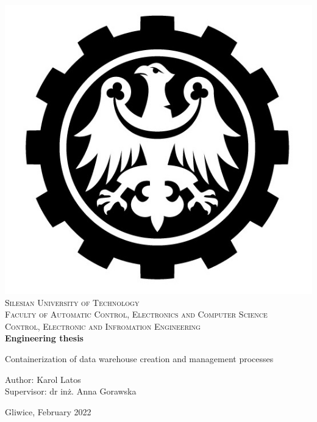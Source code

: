 \newpage \vspace{-5cm}
\thispagestyle{empty}


\begin{onehalfspacing}
\begin{center}

\centering
\includegraphics[keepaspectratio, scale=0.5]{./figures/polsl_eng_notext.jpg} \\[.8cm]

{\fontsize{17.28}{16}\selectfont
\textsc{Silesian University of Technology\\[.3cm]
Faculty of Automatic Control, Electronics and Computer Science \\[.8cm]
Control, Electronic and Infromation Engineering \\[2cm]}
\textbf{Engineering thesis}\\[1.6cm]}

\LARGE{Containerization of data warehouse creation and management processes} \\[2.4cm]

\large
\begin{flushleft}
Author: Karol Latos  \\
Supervisor: dr inż. Anna Gorawska \\
\end{flushleft}

\vspace*{\fill}
Gliwice, February 2022
\end{center}
\end{onehalfspacing}

